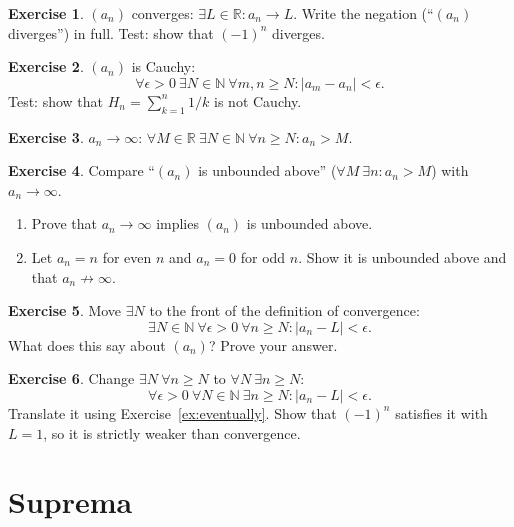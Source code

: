 \documentclass{workbook}
\theoremstyle{definition}
\newtheorem{exercise}{Exercise}[section]
\newcommand{\N}{\mathbb{N}}
\newcommand{\R}{\mathbb{R}}
\begin{document}
\begin{exercise}\label{ex:div}
$(a_n)$ converges: $\exists L \in \R : a_n \to L$. Write the negation (``$(a_n)$ diverges'') in full. Test: show that $(-1)^n$ diverges.
\end{exercise}

\begin{exercise}\label{ex:cauchy}
$(a_n)$ is Cauchy:
\[
  \forall \epsilon > 0\ \exists N \in \N\ \forall m, n \ge N : |a_m - a_n| < \epsilon.
\]
Test: show that $H_n = \sum_{k=1}^{n} 1/k$ is not Cauchy.
\end{exercise}

\begin{exercise}\label{ex:infty}
$a_n \to \infty$: $\forall M \in \R\ \exists N \in \N\ \forall n \ge N : a_n > M$.
\end{exercise}

\begin{exercise}\label{ex:unbdd}
Compare ``$(a_n)$ is unbounded above'' ($\forall M\ \exists n : a_n > M$) with $a_n \to \infty$.
\begin{enumerate}
  \item Prove that $a_n \to \infty$ implies $(a_n)$ is unbounded above.
  \item Let $a_n = n$ for even $n$ and $a_n = 0$ for odd $n$. Show it is unbounded above and that $a_n \not\to \infty$.
\end{enumerate}
\end{exercise}

\begin{exercise}\label{ex:swapconv}
Move $\exists N$ to the front of the definition of convergence:
\[
  \exists N \in \N\ \forall \epsilon > 0\ \forall n \ge N : |a_n - L| < \epsilon.
\]
What does this say about $(a_n)$? Prove your answer.
\end{exercise}

\begin{exercise}\label{ex:cluster}
Change $\exists N\ \forall n \ge N$ to $\forall N\ \exists n \ge N$:
\[
  \forall \epsilon > 0\ \forall N \in \N\ \exists n \ge N : |a_n - L| < \epsilon.
\]
Translate it using Exercise~\ref{ex:eventually}. Show that $(-1)^n$ satisfies it with $L = 1$, so it is strictly weaker than convergence.
\end{exercise}

\section{Suprema}
\end{document}
